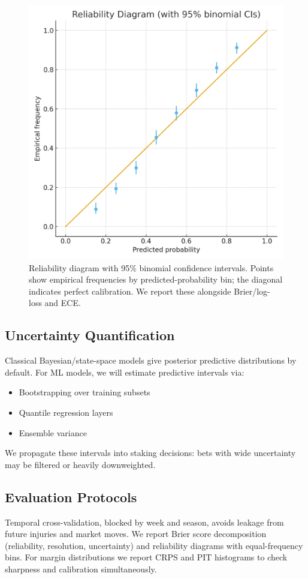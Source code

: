 \begin{figure}[t]
  \centering
  \includegraphics[width=0.9\linewidth]{../figures/reliability_diagram.png}
  \caption{Reliability diagram with 95\% binomial confidence intervals. Points show empirical frequencies by predicted-probability bin; the diagonal indicates perfect calibration. We report these alongside Brier/log-loss and ECE.}
  \label{fig:reliability}
\end{figure}

\subsection{Uncertainty Quantification}
Classical Bayesian/state-space models give posterior predictive distributions by default.  
For ML models, we will estimate predictive intervals via:
\begin{itemize}
  \item Bootstrapping over training subsets
  \item Quantile regression layers
  \item Ensemble variance
\end{itemize}
We propagate these intervals into staking decisions: bets with wide uncertainty may be filtered or heavily downweighted.

\subsection{Evaluation Protocols}
Temporal cross-validation, blocked by week and season, avoids leakage from future injuries and market moves. We report Brier score decomposition (reliability, resolution, uncertainty) and reliability diagrams with equal-frequency bins. For margin distributions we report CRPS and PIT histograms to check sharpness and calibration simultaneously.

